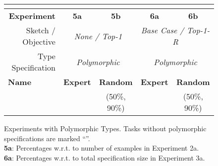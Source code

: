 \begin{figure}[h]

\experimentTableSize

\begin{tabular}{l|cc|cc}
& \multicolumn{4}{c}{\textbf{\snsMyth{}}}
\\\hline
\multicolumn{1}{r|}{\textbf{Experiment}} &
\textbf{5a} & \textbf{5b} & \textbf{6a} & \textbf{6b}
\\\hline
\multicolumn{1}{r|}{{Sketch / Objective}} &
\multicolumn{2}{c|}{\textit{None / Top-1}} &
\multicolumn{2}{c}{\textit{Base Case / Top-1-R}}
\\\hline
\multicolumn{1}{r|}{Type Specification{}} &
\multicolumn{2}{c|}{\textit{Polymorphic}} &
\multicolumn{2}{c}{\textit{Polymorphic}}
\\\hline
\textbf{Name} &
\textbf{Expert} & \textbf{Random} &
\textbf{Expert} & \textbf{Random}
\\
&
& {(50\%, 90\%)} &
& {(50\%, 90\%)}
\\

\end{tabular}

\vsepBeforeCaption
  \captionsetup{justification=centering}
  \caption{
    Experiments with Polymorphic Types.
    Tasks without polymorphic specifications are marked ``''.
    \\
    \textbf{5a}:
      Percentages w.r.t. to number of examples in Experiment 2a.
    \\
    \textbf{6a}:
      Percentages w.r.t. to total specification size in Experiment 3a.
  }
\label{fig:poly-experiments}
\end{figure}
